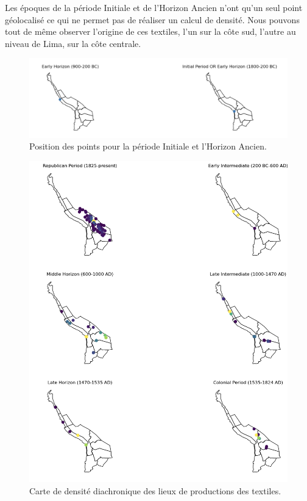 Les époques de la période Initiale et de l'Horizon Ancien n'ont qu'un seul point géolocalisé ce qui ne permet pas de réaliser un calcul de densité. Nous pouvons tout de même observer l'origine de ces textiles, l'un sur la côte sud, l'autre au niveau de Lima, sur la côte centrale.

\begin{figure}[!h]
	\begin{center}
		\includegraphics[width=15cm]{../images/carteEH.png}
		\caption{Position des points pour la période Initiale et l'Horizon Ancien.}
		\label{fig:carteEH}
	 \end{center}
\end{figure}

\begin{figure}[!h]
	\begin{center}
		\includegraphics[width=13cm]{../images/diachDensityProd.png}
		\caption{Carte de densité diachronique des lieux de productions des textiles.}
		\label{fig:density_prod}
	 \end{center}
\end{figure}

